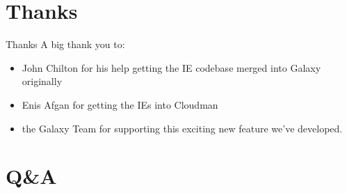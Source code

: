 \documentclass[12pt]{beamer} %
\begin{document}
\section{Thanks}
\begin{frame}{Thanks}
A big thank you to:
 \begin{itemize}
   \item John Chilton for his help getting the IE codebase merged into Galaxy originally
   \item Enis Afgan for getting the IEs into Cloudman
   \item the Galaxy Team for supporting this exciting new feature we've developed.
  \end{itemize}
\end{frame}

\section{Q\&A}
\end{document}
